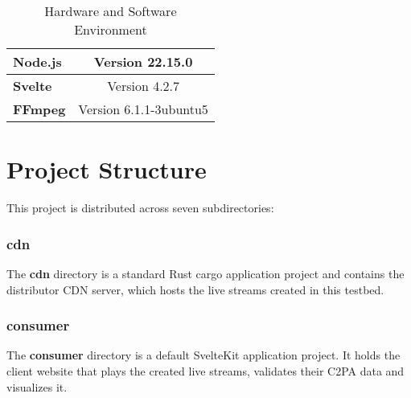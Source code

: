 \begin{table}[H]
\begin{tabular}{l|lll|}
        \multicolumn{1}{|l|}{\textbf{Node.js}}                                                     & \multicolumn{3}{c|}{Version 22.15.0}                                                                                                                                                                                                                  \\ \hline
        \multicolumn{1}{|l|}{\textbf{Svelte}}                                                      & \multicolumn{3}{c|}{Version 4.2.7}                                                                                                                                                                                                                    \\ \hline
        \multicolumn{1}{|l|}{\textbf{FFmpeg}}                                                      & \multicolumn{3}{c|}{Version 6.1.1-3ubuntu5}                                                                                                                                                                                                           \\ \hline
    \end{tabular}
    \caption{Hardware and Software Environment}
    \label{tab:env}
\end{table}

\section{Project Structure}

This project is distributed across seven subdirectories:

\subsubsection{cdn}

The \textbf{cdn} directory is a standard Rust cargo application project and contains the distributor CDN server, which hosts the live streams created in this testbed.

\subsubsection{consumer}

The \textbf{consumer} directory is a default SvelteKit application project. It holds the client website that plays the created live streams, validates their C2PA data and visualizes it.

